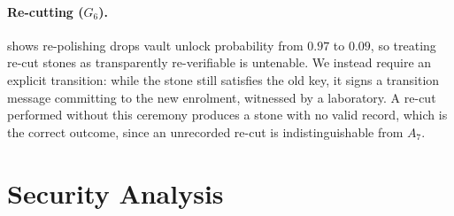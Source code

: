 \documentclass[10pt,twocolumn]{article}
\theoremstyle{remark}
\begin{document}
\paragraph{Re-cutting ($G_6$).}  shows re-polishing drops vault
unlock probability from $0.97$ to $0.09$, so treating re-cut stones as
transparently re-verifiable is untenable. We instead require an explicit
transition: while the stone still satisfies the old key, it signs a transition
message committing to the new enrolment, witnessed by a laboratory. A re-cut
performed without this ceremony produces a stone with no valid record, which is
the correct outcome, since an unrecorded re-cut is indistinguishable from $A_7$.

\section{Security Analysis}
\label{sec:security}
\end{document}
